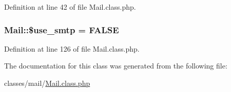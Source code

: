 Definition at line 42 of file Mail.\-class.\-php.

\hypertarget{classMail_a8fe39b2063dc112d7db67be074142628}{
\subsubsection[{\$use\-\_\-smtp}]{\setlength{\rightskip}{0pt plus 5cm}Mail\-::\$use\-\_\-smtp = F\-A\-L\-S\-E}}\label{classMail_a8fe39b2063dc112d7db67be074142628}


Definition at line 126 of file Mail.\-class.\-php.



The documentation for this class was generated from the following file\-:\begin{DoxyCompactItemize}
\item 
classes/mail/\hyperlink{Mail_8class_8php}{Mail.\-class.\-php}\end{DoxyCompactItemize}
